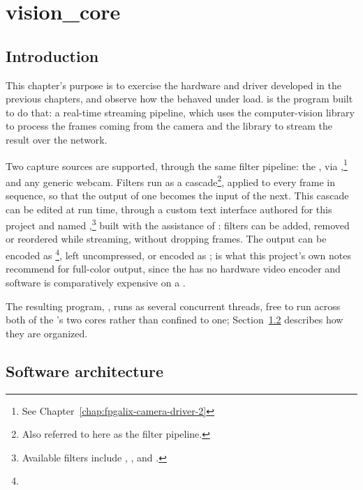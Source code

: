 \chapter{vision\_core}
\label{chap:fpgalix-vision-core}

\section{Introduction}
\label{sec:fpgalix-vision-intro}

This chapter's purpose is to exercise the hardware and driver developed in the previous chapters, and observe how the  behaved under load.  is the program built to do that: a real-time streaming pipeline, which uses the  computer-vision library to process the frames coming from the camera and the  library to stream the result over the network.

Two capture sources are supported, through the same filter pipeline: the , via ,\footnote{See Chapter~\ref{chap:fpgalix-camera-driver-2}} and any generic  webcam. Filters run as a cascade\footnote{Also referred to here as the filter pipeline.}, applied to every frame in sequence, so that the output of one becomes the input of the next. This cascade can be edited at run time, through a custom text interface authored for this project and named ,\footnote{Available filters include , ,   and .} built with the assistance of : filters can be added, removed or reordered while streaming, without dropping frames. The output can be encoded as \footnote{}, left uncompressed, or encoded as ;  is what this project's own notes recommend for full-color output, since the  has no hardware video encoder and software  is comparatively expensive on a .

The resulting program, , runs as several concurrent threads, free to run across both of the 's two  cores rather than confined to one; Section~\ref{sec:fpgalix-vision-architecture} describes how they are organized.

\section{Software architecture}
\label{sec:fpgalix-vision-architecture}

